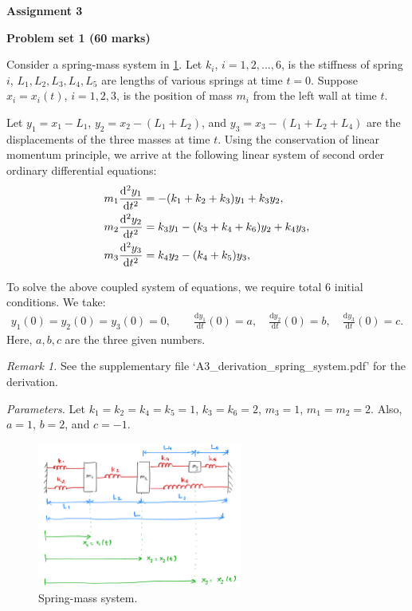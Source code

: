 \documentclass[11pt,a4paper]{report}
\newcommand{\dd}{\mathrm{d}}
\begin{document}
\begin{center} 
\textbf{\Large Assignment 3} 
\end{center}

\begin{center}
\textbf{\Large Problem set 1 (60 marks)}
\end{center}

Consider a spring-mass system in \cref{fig:spring}. Let $k_i$, $i=1, 2, ..., 6$,  is the stiffness of spring $i$, $L_1, L_2, L_3, L_4, L_5$ are lengths of various springs at time $t=0$. Suppose $x_i = x_i(t)$, $i=1,2,3$, is the position of mass $m_i$ from the left wall at time $t$. 

Let $y_1 = x_1 - L_1$, $y_2 = x_2 - (L_1 + L_2)$, and $y_3 = x_3 - (L_1+L_2+L_4)$ are the displacements of the three masses at time $t$. Using the conservation of linear momentum principle, we arrive at the following linear system of second order ordinary differential equations:
\begin{align}\label{eq:ode}
m_1 \frac{\dd^2 y_1}{\dd t^2} &= -(k_1 + k_2 + k_3) y_1 + k_3 y_2, \notag \\
m_2 \frac{\dd^2 y_2}{\dd t^2} &= k_3 y_1 - (k_3 + k_4 + k_6) y_2 + k_4 y_3, \notag \\
m_3 \frac{\dd^2 y_3}{\dd t^2} &= k_4 y_2 - (k_4 + k_5) y_3, 
\end{align}

To solve the above coupled system of equations, we require total 6 initial conditions. We take:
\begin{align}\label{eq:ic}
y_1(0) = y_2(0) = y_3(0) = 0, \qquad \frac{\dd y_1}{\dd t}(0) = a, \quad \frac{\dd y_2}{\dd t}(0) = b, \quad \frac{\dd y_3}{\dd t}(0) = c .
\end{align}
Here, $a,b,c$ are the three given numbers.

\vspace{10pt}
\noindent\textit{Remark 1.} See the supplementary file `A3\_derivation\_spring\_system.pdf' for the derivation.

\vspace{10pt}
\noindent\textit{Parameters.} Let $k_1 = k_2 = k_4 = k_5 = 1$, $k_3 = k_6 = 2$, $m_3 = 1$, $m_1 = m_2 = 2$. Also, $a = 1$, $b=2$, and $c = -1$. 

\begin{figure}[H]
\centering
\includegraphics[width=0.6\textwidth]{spring_system_draw.pdf}
\caption{Spring-mass system.}\label{fig:spring}
\end{figure}
\end{document}

